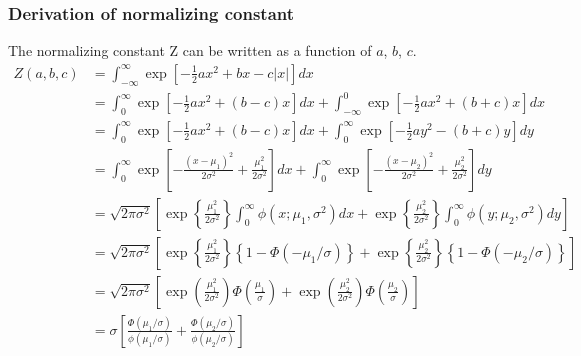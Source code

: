 \subsubsection{Derivation of normalizing constant}
The normalizing constant Z can be written as a function of $a$, $b$, $c$.
$$
\begin{array}{rl}
	Z(a,b,c)
	&  = \int_{-\infty}^\infty \exp\left[ -\tfrac{1}{2}ax^2 + bx - c|x| \right] dx
	\\ [2ex]
	&  
	= \int_0^\infty    \exp\left[ -\tfrac{1}{2}ax^2 + (b - c)x \right] dx
	+ \int_{-\infty}^0 \exp\left[ -\tfrac{1}{2}ax^2 + (b + c)x \right] dx
	\\ [2ex]
	& 
	= \int_0^\infty \exp\left[ -\tfrac{1}{2}ax^2 + (b - c)x \right] dx
	+ \int_0^\infty \exp\left[ -\tfrac{1}{2}ay^2 - (b + c)y \right] dy
	\\ [2ex]
	& 
	= \int_0^\infty \exp\left[ - \frac{(x - \mu_1)^2}{2\sigma^2} + \frac{\mu_1^2}{2\sigma^2} \right] dx
	+ \int_0^\infty \exp\left[ - \frac{(x - \mu_2)^2}{2\sigma^2} + \frac{\mu_2^2}{2\sigma^2} \right] dy
	\\ [2ex]	& 
	= \sqrt{2\pi\sigma^2}
	\left[  \exp\left\{  \frac{\mu_1^2}{2\sigma^2} \right\} \int_0^\infty \phi(x;\mu_1,\sigma^2) dx
	+       \exp\left\{  \frac{\mu_2^2}{2\sigma^2} \right\} \int_0^\infty \phi(y;\mu_2,\sigma^2) dy
	\right] 
	\\ [2ex]
	& 
	= \sqrt{2\pi\sigma^2}
	\left[  \exp\left\{  \frac{\mu_1^2}{2\sigma^2} \right\} \left\{ 1 - \Phi(-\mu_1/\sigma) \right\} 
	+       \exp\left\{  \frac{\mu_2^2}{2\sigma^2} \right\} \left\{ 1 - \Phi(-\mu_2/\sigma) \right\} 
	\right] 
	\\ [2ex]
	& 
	= \sqrt{2\pi\sigma^2}
	\left[  \exp\left(  \frac{\mu_1^2}{2\sigma^2} \right) \Phi\left(\frac{\mu_1}{\sigma} \right) 
	+       \exp\left(  \frac{\mu_2^2}{2\sigma^2} \right) \Phi\left( \frac{\mu_2}{\sigma} \right)  
	\right] 
	
	
	\\ [2ex]
	& 
	= 
	\sigma \left[ \frac{\Phi(\mu_1/\sigma)}{\phi(\mu_1/\sigma)}
	+ \frac{\Phi(\mu_2/\sigma)}{\phi(\mu_2/\sigma)}  \right] 
\end{array} 
$$

